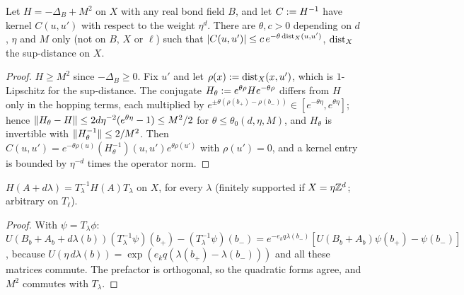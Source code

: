 \begin{lemma}\label{sup2:lem:S8CT}
Let $H=-\Delta_B+M^2$ on $X$ with any real bond field $B$, and let $C:= H^{-1}$ have kernel $C(u,u')$ with respect to the weight $\eta^d$. There are $\theta,c>0$ depending on $d$, $\eta$ and $M$ only (not on $B$, $X$ or $\ell$) such that $|C(u,u')|\le c\,e^{-\theta\operatorname{dist}_X(u,u')}$, $\operatorname{dist}_X$ the sup-distance on $X$.
\end{lemma}

\begin{proof}
$H\ge M^2$ since $-\Delta_B\ge0$. Fix $u'$ and let $\rho(x):=\operatorname{dist}_X(x,u')$, which is $1$-Lipschitz for the sup-distance. The conjugate $H_\theta:= e^{\theta\rho}He^{-\theta\rho}$ differs from $H$ only in the hopping terms, each multiplied by $e^{\pm\theta(\rho(b_+)-\rho(b_-))}\in[e^{-\theta\eta},e^{\theta\eta}]$; hence $\lVert H_\theta-H\rVert\le2d\eta^{-2}(e^{\theta\eta}-1)\le M^2/2$ for $\theta\le\theta_0(d,\eta,M)$, and $H_\theta$ is invertible with $\lVert H_\theta^{-1}\rVert\le2/M^2$. Then $C(u,u')=e^{-\theta\rho(u)}(H_\theta^{-1})(u,u')e^{\theta\rho(u')}$ with $\rho(u')=0$, and a kernel entry is bounded by $\eta^{-d}$ times the operator norm.
\end{proof}

\begin{lemma}\label{sup2:lem:S8cov}
$H(A+d\lambda)=T_\lambda^{-1}H(A)T_\lambda$ on $X$, for every $\lambda$ (finitely supported if $X=\eta\mathbb Z^d$; arbitrary on $T_\ell$).
\end{lemma}

\begin{proof}
With $\psi=T_\lambda\phi$: $U(B_b+A_b+d\lambda(b))(T_\lambda^{-1}\psi)(b_+)-(T_\lambda^{-1}\psi)(b_-)=e^{-e_kq\lambda(b_-)}[U(B_b+A_b)\psi(b_+)-\psi(b_-)]$, because $U(\eta\,d\lambda(b))=\exp(e_kq(\lambda(b_+)-\lambda(b_-)))$ and all these matrices commute. The prefactor is orthogonal, so the quadratic forms agree, and $M^2$ commutes with $T_\lambda$.
\end{proof}

